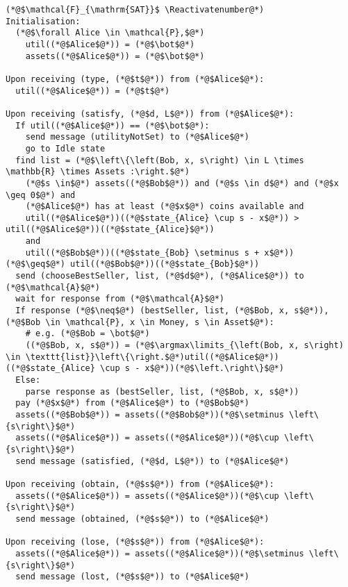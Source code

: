 \Suppressnumber
\begin{lstlisting}[label=satfunc, style=numbers]
(*@$\mathcal{F}_{\mathrm{SAT}}$ \Reactivatenumber@*)
Initialisation:
  (*@$\forall Alice \in \mathcal{P},$@*)
    util((*@$Alice$@*)) = (*@$\bot$@*)
    assets((*@$Alice$@*)) = (*@$\bot$@*)

Upon receiving (type, (*@$t$@*)) from (*@$Alice$@*):
  util((*@$Alice$@*)) = (*@$t$@*)

Upon receiving (satisfy, (*@$d, L$@*)) from (*@$Alice$@*):
  If util((*@$Alice$@*)) == (*@$\bot$@*):
    send message (utilityNotSet) to (*@$Alice$@*)
    go to Idle state
  find list = (*@$\left\{\left(Bob, x, s\right) \in L \times \mathbb{R} \times Assets :\right.$@*)
    (*@$s \in$@*) assets((*@$Bob$@*)) and (*@$s \in d$@*) and (*@$x \geq 0$@*) and
    (*@$Alice$@*) has at least (*@$x$@*) coins available and
    util((*@$Alice$@*))((*@$state_{Alice} \cup s - x$@*)) > util((*@$Alice$@*))((*@$state_{Alice}$@*))
    and
    util((*@$Bob$@*))((*@$state_{Bob} \setminus s + x$@*)) (*@$\geq$@*) util((*@$Bob$@*))((*@$state_{Bob}$@*))
  send (chooseBestSeller, list, (*@$d$@*), (*@$Alice$@*)) to (*@$\mathcal{A}$@*)
  wait for response from (*@$\mathcal{A}$@*)
  If response (*@$\neq$@*) (bestSeller, list, (*@$Bob, x, s$@*)), (*@$Bob \in \mathcal{P}, x \in Money, s \in Asset$@*):
    # e.g. (*@$Bob = \bot$@*)
    ((*@$Bob, x, s$@*)) = (*@$\argmax\limits_{\left(Bob, x, s\right) \in \texttt{list}}\left\{\right.$@*)util((*@$Alice$@*))((*@$state_{Alice} \cup s - x$@*))(*@$\left.\right\}$@*)
  Else:
    parse response as (bestSeller, list, (*@$Bob, x, s$@*))
  pay (*@$x$@*) from (*@$Alice$@*) to (*@$Bob$@*)
  assets((*@$Bob$@*)) = assets((*@$Bob$@*))(*@$\setminus \left\{s\right\}$@*)
  assets((*@$Alice$@*)) = assets((*@$Alice$@*))(*@$\cup \left\{s\right\}$@*)
  send message (satisfied, (*@$d, L$@*)) to (*@$Alice$@*)

Upon receiving (obtain, (*@$s$@*)) from (*@$Alice$@*):
  assets((*@$Alice$@*)) = assets((*@$Alice$@*))(*@$\cup \left\{s\right\}$@*)
  send message (obtained, (*@$s$@*)) to (*@$Alice$@*)

Upon receiving (lose, (*@$s$@*)) from (*@$Alice$@*):
  assets((*@$Alice$@*)) = assets((*@$Alice$@*))(*@$\setminus \left\{s\right\}$@*)
  send message (lost, (*@$s$@*)) to (*@$Alice$@*)
\end{lstlisting}
